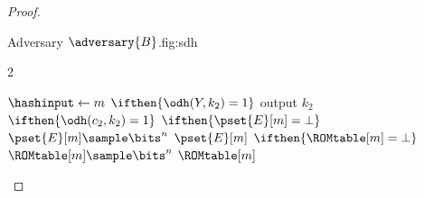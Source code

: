 \begin{proof}
\begin{itemize}
\begin{gamefigure}{Adversary $\adversary{B}$.}{fig:sdh}
\begin{games}{2}
\begin{gameenv}{\oracledec}
                                                            \State $\hashinput \gets m$
                                                            \State $\ifthen{\odh(Y, k_2) = 1}$ \label{line:found_cdh}
                                                                \State \qquad output $k_2$
                                                                \State $\ifthen{\odh(c_2, k_2) = 1}$ \label{line:is_valid_query}
                                                                    \State \qquad $\ifthen{\pset{E}[m] = \bot}$
                                                                        \State \qquad \quad $\pset{E}[m] \sample \bits^{n}$
                                                                        \State \qquad \Return $\pset{E}[m]$
                                                                        \State $\ifthen{\ROMtable[m] = \bot}$
                                                                            \State \quad $\ROMtable[m] \sample \bits^{n}$
                                                                            \State \Return $\ROMtable[m]$
                                                                        \end{gameenv}
                                                                    \end{games}
                                                                \end{gamefigure}


\end{itemize}
\end{proof}
